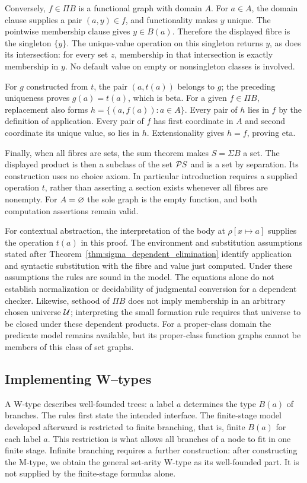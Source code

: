 Conversely, $f\in\Pi B$ is a functional graph with domain $A$.
For $a\in A$, the domain clause supplies a pair $(a,y)\in f$,
and functionality makes $y$ unique. The pointwise membership clause
gives $y\in B(a)$. Therefore the displayed fibre is the singleton
$\{y\}$. The unique-value operation on this singleton returns $y$,
as does its intersection: for every set $z$, membership in that
intersection is exactly membership in $y$. No default value on
empty or nonsingleton classes is involved.

For $g$ constructed from $t$, the pair $(a,t(a))$ belongs to $g$;
the preceding uniqueness proves $g(a)=t(a)$, which is beta.
For a given $f\in\Pi B$, replacement also forms
$h=\{(a,f(a)):a\in A\}$. Every pair of $h$ lies in $f$ by the
definition of application. Every pair of $f$ has first coordinate
in $A$ and second coordinate its unique value, so lies in $h$.
Extensionality gives $h=f$, proving eta.

Finally, when all fibres are sets, the sum theorem makes
$S=\Sigma B$ a set. The displayed product is then a subclass of
the set $\mathcal{P} S$ and is a set by separation. Its construction
uses no choice axiom. In particular introduction requires a supplied
operation $t$, rather than asserting a section exists whenever all
fibres are nonempty. For $A=\varnothing$ the sole graph is the
empty function, and both computation assertions remain valid.
\Done

For contextual abstraction, the interpretation of the body at
$\rho[x\mapsto a]$ supplies the operation $t(a)$ in this proof.
The environment and substitution assumptions stated after
Theorem~\ref{thm:sigma_dependent_elimination} identify application
and syntactic substitution with the fibre and value just computed.
Under these assumptions the rules are sound in the model. The
equations alone do not establish normalization or decidability of
judgmental conversion for a dependent checker. Likewise, sethood
of $\Pi B$ does not imply membership in an arbitrary chosen universe
$\mathcal{U}$; interpreting the small formation rule requires that universe
to be closed under these dependent products. For a proper-class
domain the predicate model remains available, but its proper-class
function graphs cannot be members of this class of set graphs.
\pagebreak
\subsection{Implementing W--types}
A W-type describes well-founded trees: a label $a$ determines the type
$B(a)$ of branches. The rules first state the intended interface. The
finite-stage model developed afterward is restricted to finite branching,
that is, finite $B(a)$ for each label $a$. This restriction is what allows
all branches of a node to fit in one finite stage. Infinite branching
requires a further construction: after constructing
the M-type, we obtain the general set-arity W-type as its well-founded
part. It is not supplied by the finite-stage formulas alone.

